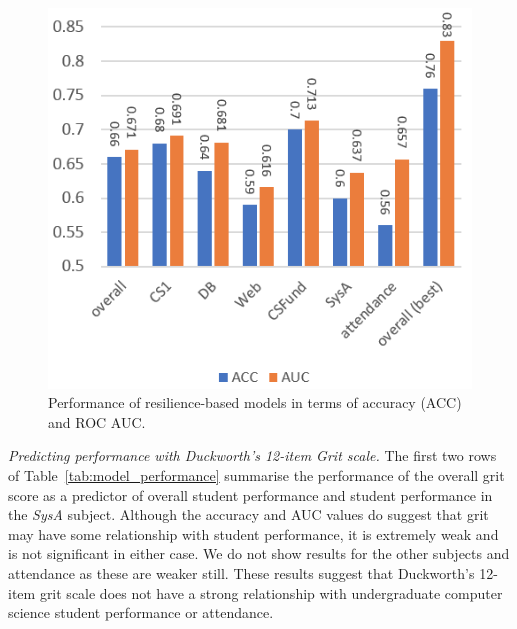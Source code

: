 \documentclass[sigconf]{acmart}
\begin{document}
\begin{figure} [h]
\centering
\includegraphics[width=.9\linewidth]{images/model_performance.png}
\caption{Performance of resilience-based models in terms of accuracy (ACC) and ROC AUC.}
\label{fig:model_performance} 
\end{figure}

{\em Predicting performance with Duckworth's 12-item Grit scale.}
The first two rows of Table~\ref{tab:model_performance} summarise the performance of the overall grit score as a predictor of overall student performance and student performance in the {\em SysA} subject. Although the accuracy and AUC values do suggest that grit may have some relationship with student performance, it is extremely weak and is not significant in either case. We do not show results for the other subjects and attendance as these are weaker still. These results suggest that Duckworth's 12-item grit scale does not have a strong relationship with undergraduate computer science student performance or attendance. 
\end{document}
